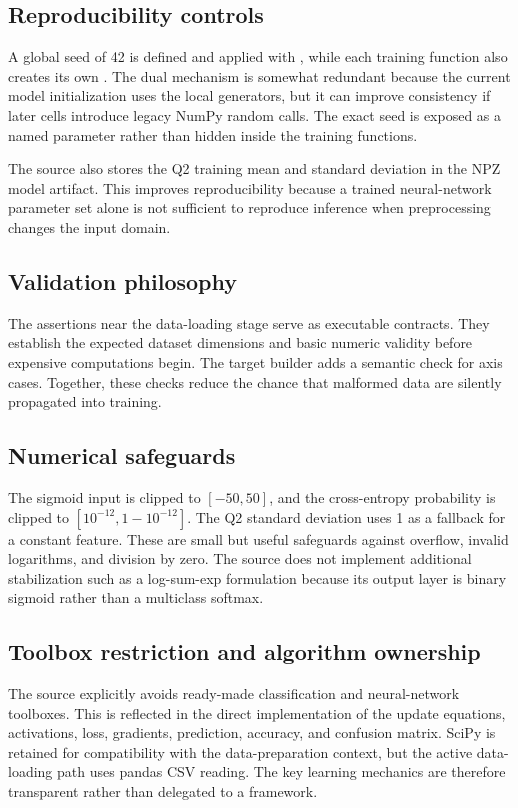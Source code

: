 \documentclass[11pt,a4paper]{article}
\newcommand{\code}[1]{\texttt{\detokenize{#1}}}
\begin{document}
\subsection{Reproducibility controls}
A global seed of 42 is defined and applied with \code{np.random.seed(SEED)}, while each training function also creates its own \code{default_rng(seed)}. The dual mechanism is somewhat redundant because the current model initialization uses the local generators, but it can improve consistency if later cells introduce legacy NumPy random calls. The exact seed is exposed as a named parameter rather than hidden inside the training functions.

The source also stores the Q2 training mean and standard deviation in the NPZ model artifact. This improves reproducibility because a trained neural-network parameter set alone is not sufficient to reproduce inference when preprocessing changes the input domain.

\subsection{Validation philosophy}
The assertions near the data-loading stage serve as executable contracts. They establish the expected dataset dimensions and basic numeric validity before expensive computations begin. The target builder adds a semantic check for axis cases. Together, these checks reduce the chance that malformed data are silently propagated into training.

\subsection{Numerical safeguards}
The sigmoid input is clipped to \([-50,50]\), and the cross-entropy probability is clipped to \([10^{-12},1-10^{-12}]\). The Q2 standard deviation uses 1 as a fallback for a constant feature. These are small but useful safeguards against overflow, invalid logarithms, and division by zero. The source does not implement additional stabilization such as a log-sum-exp formulation because its output layer is binary sigmoid rather than a multiclass softmax.

\subsection{Toolbox restriction and algorithm ownership}
The source explicitly avoids ready-made classification and neural-network toolboxes. This is reflected in the direct implementation of the update equations, activations, loss, gradients, prediction, accuracy, and confusion matrix. SciPy is retained for compatibility with the data-preparation context, but the active data-loading path uses pandas CSV reading. The key learning mechanics are therefore transparent rather than delegated to a framework.
\end{document}
